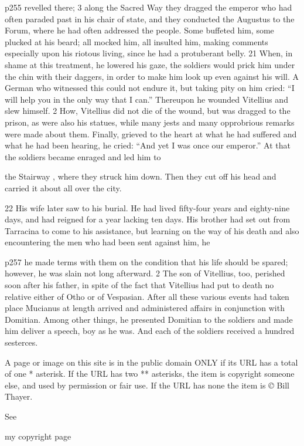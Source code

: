 p255 revelled there; 3 along the Sacred Way they dragged the emperor who had often paraded past in his chair of state, and they conducted the Augustus to the Forum, where he had often addressed the people. Some buffeted him, some plucked at his beard; all mocked him, all insulted him, making comments especially upon his riotous living, since he had a protuberant belly. 21
When, in shame at this treatment, he lowered his gaze, the soldiers would prick him under the chin with their daggers, in order to make him look up even against his will. A German who witnessed this could not endure it, but taking pity on him cried: ``I will help you in the only way that I can.'' Thereupon he wounded Vitellius and slew himself. 2 How, Vitellius did not die of the wound, but was dragged to the prison, as were also his statues, while many jests and many opprobrious remarks were made about them. Finally, grieved to the heart at what he had suffered and what he had been hearing, he cried: ``And yet I was once our emperor.'' At that the soldiers became enraged and led him to

the Stairway , where they struck him down. Then they cut off his head and carried it about all over the city.

22
His wife later saw to his burial. He had lived fifty-four years and eighty-nine days, and had reigned for a year lacking ten days. His brother had set out from Tarracina to come to his assistance, but learning on the way of his death and also encountering the men who had been sent against him, he

p257 he made terms with them on the condition that his life should be spared; however, he was slain not long afterward. 2 The son of Vitellius, too, perished soon after his father, in spite of the fact that Vitellius had put to death no relative either of Otho or of Vespasian. After all these various events had taken place Mucianus at length arrived and administered affairs in conjunction with Domitian. Among other things, he presented Domitian to the soldiers and made him deliver a speech, boy as he was. And each of the soldiers received a hundred sesterces.

A page or image on this site is in the public domain ONLY if its URL has a total of one * asterisk. If the URL has two ** asterisks, the item is copyright someone else, and used by permission or fair use. If the URL has none the item is \emph{©} Bill Thayer.

See

my copyright page

